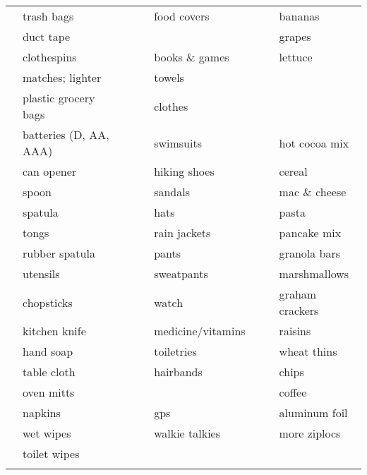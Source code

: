 \documentclass[10pt]{article}
\newcommand{\mybox}{\framebox[4mm]{\textcolor{white} m} \framebox[4mm]{\textcolor{white} m} }
\begin{document}
\begin{tabular}{rlcrlcrl}
\mybox & trash bags             &    &\mybox & food covers          &    &\mybox & bananas \\
\mybox & duct tape              &    &\mybox &                      &    &\mybox & grapes \\ \cline{4-5}
\mybox & clothespins            &    &\mybox & books \& games       &    &\mybox & lettuce \\
\mybox & matches; lighter       &    &\mybox & towels               &    &\mybox & \\
\mybox & plastic grocery bags   &    &\mybox & clothes              &    &\mybox & \\ \cline{7-8}
\mybox & batteries (D, AA, AAA) &    &\mybox & swimsuits            &    &\mybox & hot cocoa mix \\ \cline{1-2}
\mybox & can opener             &    &\mybox & hiking shoes         &    &\mybox & cereal \\
\mybox & spoon                  &    &\mybox & sandals              &    &\mybox & mac \& cheese \\
\mybox & spatula                &    &\mybox & hats                 &    &\mybox & pasta \\
\mybox & tongs                  &    &\mybox & rain jackets         &    &\mybox & pancake mix \\
\mybox & rubber spatula         &    &\mybox & pants                &    &\mybox & granola bars \\
\mybox & utensils               &    &\mybox & sweatpants           &    &\mybox & marshmallows \\
\mybox & chopsticks             &    &\mybox & watch                &    &\mybox & graham crackers \\
\mybox & kitchen knife          &    &\mybox & medicine/vitamins    &    &\mybox & raisins \\
\mybox & hand soap              &    &\mybox & toiletries           &    &\mybox & wheat thins \\
\mybox & table cloth            &    &\mybox & hairbands            &    &\mybox & chips \\ 
\mybox & oven mitts             &    &\mybox &                      &    &\mybox & coffee \\ \cline{4-5}
\mybox & napkins                &    &\mybox & gps                  &    &\mybox & aluminum foil \\
\mybox & wet wipes              &    &\mybox & walkie talkies       &    &\mybox & more ziplocs \\
\mybox & toilet wipes           &    &\mybox &                      &    &\mybox & \\
\mybox & \hspace{1.5in}         &    &\mybox & \hspace{1.5in}       &    &\mybox & \hspace{1.5in} \\ \hline
\end{tabular}
\end{document}
